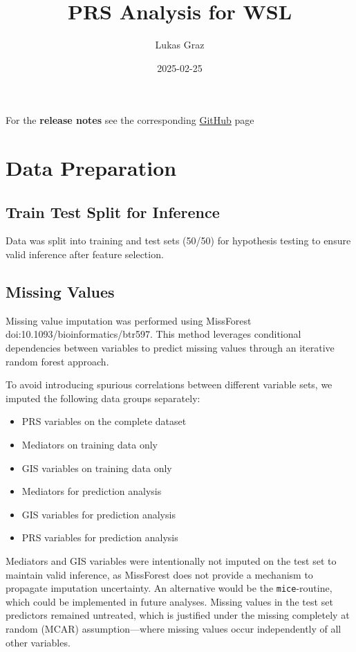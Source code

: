 \documentclass[
  letterpaper,
  DIV=11,
  numbers=noendperiod]{scrartcl}
\title{PRS Analysis for WSL}
\author{Lukas Graz}
\date{2025-02-25}
\providecommand{\tightlist}{%
  \setlength{\itemsep}{0pt}\setlength{\parskip}{0pt}}
\begin{document}
\maketitle


For the \textbf{release notes} see the corresponding
\href{https://github.com/LGraz/wsl--prs-analysis/releases}{GitHub} page

\section{Data Preparation}\label{data-preparation}

\subsection{Train Test Split for
Inference}\label{train-test-split-for-inference}

Data was split into training and test sets (50/50) for hypothesis
testing to ensure valid inference after feature selection.

\subsection{Missing Values}\label{missing-values}

Missing value imputation was performed using MissForest
doi:10.1093/bioinformatics/btr597. This method leverages conditional
dependencies between variables to predict missing values through an
iterative random forest approach.

To avoid introducing spurious correlations between different variable
sets, we imputed the following data groups separately:

\begin{itemize}
\tightlist
\item
  PRS variables on the complete dataset
\item
  Mediators on training data only
\item
  GIS variables on training data only
\item
  Mediators for prediction analysis
\item
  GIS variables for prediction analysis
\item
  PRS variables for prediction analysis
\end{itemize}

Mediators and GIS variables were intentionally not imputed on the test
set to maintain valid inference, as MissForest does not provide a
mechanism to propagate imputation uncertainty. An alternative would be
the \texttt{mice}-routine, which could be implemented in future
analyses. Missing values in the test set predictors remained untreated,
which is justified under the missing completely at random (MCAR)
assumption---where missing values occur independently of all other
variables.
\end{document}
